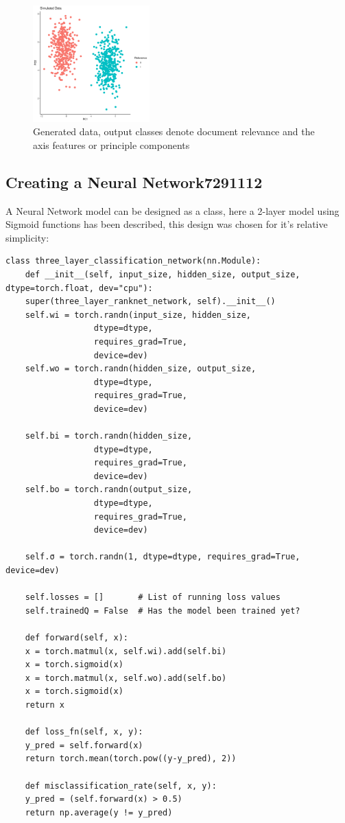 \documentclass[a4paper,11pt,twoside]{article}
\begin{document}
\begin{figure}[htbp]
\centering
\includegraphics[width=0.4\textwidth]{SimulatedData.png}
\caption{\label{fig:orgeee555b}Generated data, output classes denote document relevance and the axis features or principle components}
\end{figure}

\subsection{Creating a Neural Network\hfill{}\textsc{7291112}}
\label{sec:orgef2649b}
A Neural Network model can be designed as a class, here a 2-layer
model using Sigmoid functions has been described, this design was
chosen for it's relative simplicity:

\begin{verbatim}
class three_layer_classification_network(nn.Module):
    def __init__(self, input_size, hidden_size, output_size, dtype=torch.float, dev="cpu"):
	super(three_layer_ranknet_network, self).__init__()
	self.wi = torch.randn(input_size, hidden_size,
			      dtype=dtype,
			      requires_grad=True,
			      device=dev)
	self.wo = torch.randn(hidden_size, output_size,
			      dtype=dtype,
			      requires_grad=True,
			      device=dev)

	self.bi = torch.randn(hidden_size,
			      dtype=dtype,
			      requires_grad=True,
			      device=dev)
	self.bo = torch.randn(output_size,
			      dtype=dtype,
			      requires_grad=True,
			      device=dev)

	self.σ = torch.randn(1, dtype=dtype, requires_grad=True, device=dev)

	self.losses = []       # List of running loss values
	self.trainedQ = False  # Has the model been trained yet?

    def forward(self, x):
	x = torch.matmul(x, self.wi).add(self.bi)
	x = torch.sigmoid(x)
	x = torch.matmul(x, self.wo).add(self.bo)
	x = torch.sigmoid(x)
	return x

    def loss_fn(self, x, y):
	y_pred = self.forward(x)
	return torch.mean(torch.pow((y-y_pred), 2))

    def misclassification_rate(self, x, y):
	y_pred = (self.forward(x) > 0.5)
	return np.average(y != y_pred)
\end{verbatim}
\end{document}
